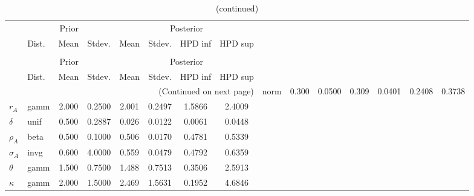  
\begin{center}
\begin{longtable}{llcccccc} 
\caption{Results from Metropolis-Hastings (parameters)}
 \label{Table:MHPosterior:1}\\
\toprule 
  & \multicolumn{3}{c}{Prior}  &  \multicolumn{4}{c}{Posterior} \\
  \cmidrule(r{.75em}){2-4} \cmidrule(r{.75em}){5-8}
  & Dist. & Mean  & Stdev. & Mean & Stdev. & HPD inf & HPD sup\\
\midrule \endfirsthead 
\caption{(continued)}\\\toprule 
  & \multicolumn{3}{c}{Prior}  &  \multicolumn{4}{c}{Posterior} \\
  \cmidrule(r{.75em}){2-4} \cmidrule(r{.75em}){5-8}
  & Dist. & Mean  & Stdev. & Mean & Stdev. & HPD inf & HPD sup\\
\midrule \endhead 
\bottomrule \multicolumn{8}{r}{(Continued on next page)} \endfoot 
\bottomrule \endlastfoot 
${\alpha}$ & norm &   0.300 & 0.0500 &   0.309& 0.0401 &  0.2408 &  0.3738 \\ 
${r_{A}}$ & gamm &   2.000 & 0.2500 &   2.001& 0.2497 &  1.5866 &  2.4009 \\ 
${\delta}$ & unif &   0.500 & 0.2887 &   0.026& 0.0122 &  0.0061 &  0.0448 \\ 
${\rho_A}$ & beta &   0.500 & 0.1000 &   0.506& 0.0170 &  0.4781 &  0.5339 \\ 
${\sigma_A}$ & invg &   0.600 & 4.0000 &   0.559& 0.0479 &  0.4792 &  0.6359 \\ 
${\theta}$ & gamm &   1.500 & 0.7500 &   1.488& 0.7513 &  0.3506 &  2.5913 \\ 
${\kappa}$ & gamm &   2.000 & 1.5000 &   2.469& 1.5631 &  0.1952 &  4.6846 \\ 
\end{longtable}
 \end{center}

